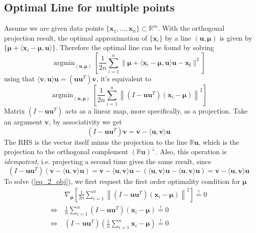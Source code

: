 \documentclass[../book-template.tex]{subfiles}
\begin{document}
\subsection{Optimal Line for multiple points}
Assume we are given data points $\{\bm{x}_1,\dots,\bm{x}_n\}\subset \mathbb{R}^m$. With the orthogonal projection result, the optimal approximation of $\{\bm{x}_i\}$ by a line $(\bm{u},\bm{\mu})$ is given by $\{\bm{\mu} + \langle \bm{x}_i-\bm{\mu},\bm{u} \rangle\}$. Therefore the optimal line can be found by solving
\begin{equation*}
    \mathop{\arg\min}_{(\bm{u},\bm{\mu})} \left[ \frac{1}{2n}\sum_{i=1}^n \| \bm{\mu}+ \langle \bm{x}_i-\bm{\mu},\bm{u\rangle\bm{u} - \bm{x}_i} \|^2\right]
\end{equation*}
using that $\langle\bm{v},\bm{u}\rangle\bm{u}=(\bm{u}\bm{u}^T)\bm{v}$, it's equivalent to
\begin{equation}\label{eq_2_obj}
    \mathop{\arg\min}_{(\bm{u},\bm{\mu})} \left[ \frac{1}{2n}\sum_{i=1}^n \left\| \left(I-\bm{u}\bm{u}^T \right)(\bm{x}_i-\bm{\mu}) \right\| ^2\right]
\end{equation}
Matrix $\left(I-\bm{u}\bm{u}^T \right)$ acts as a linear map, more specifically, as a projection. Take an argument $\bm{v}$, by associativity we get
\begin{equation*}
    \left(I-\bm{u}\bm{u}^T \right)\bm{v} = \bm{v} - \langle \bm{u}, \bm{v}\rangle\bm{u}
\end{equation*}
The RHS is the vector itself minus the projection to the line $\mathbb{R}\bm{u}$, which is the projection to the orthogonal complement $(\mathbb{R}\bm{u})^{\bot}$. Also, this operation is \emph{idempotent}, i.e. projecting a second time gives the same result, since
\begin{equation*}
     \left(I-\bm{u}\bm{u}^T \right)( \bm{v} - \langle \bm{u}, \bm{v}\rangle\bm{u}) =  \bm{v} - \langle \bm{u}, \bm{v}\rangle\bm{u} - ( \langle \bm{u}, \bm{v}\rangle\bm{u} -  \langle \bm{u}, \bm{v}\rangle\bm{u}) =  \bm{v} - \langle \bm{u}, \bm{v}\rangle\bm{u}
\end{equation*}
To solve (\ref{eq_2_obj}), we first request the first order optimality condition for $\bm{\mu}$
\begin{align*}
    &\nabla_{\bm{\mu}} \left[ \frac{1}{2n}\sum_{i=1}^n \left\| \left(I-\bm{u}\bm{u}^T \right)(\bm{x}_i-\bm{\mu}) \right\| ^2\right] \overset{!}{=} 0\\
    \Longleftrightarrow ~&  \frac{1}{n}\sum_{i=1}^n  \left(I-\bm{u}\bm{u}^T \right)(\bm{x}_i-\bm{\mu}) \overset{!}{=} 0\\
    \Longleftrightarrow ~& \left(I-\bm{u}\bm{u}^T \right)(\frac{1}{n}\sum_{i=1}^n\bm{x}_i-\bm{\mu})\overset{!}{=} 0
\end{align*}
\end{document}
